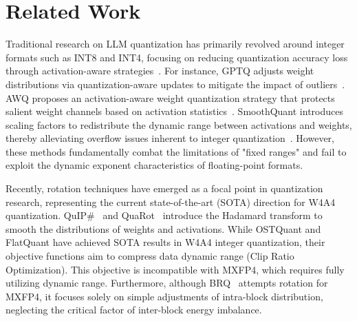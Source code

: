 \section{Related Work}
Traditional research on LLM quantization has primarily revolved around integer formats such as INT8 and INT4, focusing on reducing quantization accuracy loss through activation-aware strategies~\cite{illm,mambaquant}. For instance, GPTQ adjusts weight distributions via quantization-aware updates to mitigate the impact of outliers~\cite{gptq,gptaq}. AWQ proposes an activation-aware weight quantization strategy that protects salient weight channels based on activation statistics~\cite{awq}. SmoothQuant introduces scaling factors to redistribute the dynamic range between activations and weights, thereby alleviating overflow issues inherent to integer quantization~\cite{smoothquant}. However, these methods fundamentally combat the limitations of "fixed ranges" and fail to exploit the dynamic exponent characteristics of floating-point formats.

Recently, rotation techniques have emerged as a focal point in quantization research, representing the current state-of-the-art (SOTA) direction for W4A4 quantization. QuIP\#~\cite{quip_sharp} and QuaRot~\cite{quarot} introduce the Hadamard transform to smooth the distributions of weights and activations. While OSTQuant and FlatQuant have achieved SOTA results in W4A4 integer quantization, their objective functions aim to compress data dynamic range (Clip Ratio Optimization). This objective is incompatible with MXFP4, which requires fully utilizing dynamic range. Furthermore, although BRQ~\cite{brq} attempts rotation for MXFP4, it focuses solely on simple adjustments of intra-block distribution, neglecting the critical factor of inter-block energy imbalance.

